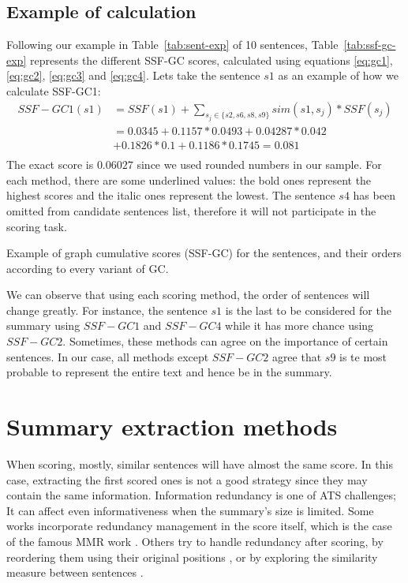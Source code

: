 \subsection{Example of calculation}

Following our example in Table~\ref{tab:sent-exp} of 10 sentences, Table~\ref{tab:ssf-gc-exp} represents the different SSF-GC scores, calculated using equations \ref{eq:gc1}, \ref{eq:gc2}, \ref{eq:gc3} and \ref{eq:gc4}.
Lets take the sentence $ s1 $ as an example of how we calculate SSF-GC1:
\begin{align*}
	SSF-GC1(s1) & = SSF(s1) + \sum\limits_{s_j \in \{s2, s6, s8, s9\}} sim(s1, s_j) * SSF(s_j) \\
	& = 0.0345 + 0.1157 * 0.0493 + 0.04287 * 0.042 \\
	& + 0.1826 * 0.1 + 0.1186 * 0.1745 = 0.081 \\
\end{align*}
The exact score is $ 0.06027 $ since we used rounded numbers in our sample.
For each method, there are some underlined values: the bold ones represent the highest scores and the italic ones represent the lowest.
The sentence $ s4 $ has been omitted from candidate sentences list, therefore it will not participate in the scoring task.

\begin{table}[ht]
	\centering
	\caption{Example of graph cumulative scores (SSF-GC) for the sentences, and their orders according to every variant of GC.}
	\label{tab:ssf-gc-exp}
\end{table}

We can observe that using each scoring method, the order of sentences will change greatly. 
For instance, the sentence $ s1 $ is the last to be considered for the summary using $ SSF-GC1 $ and $ SSF-GC4 $ while it has more chance using $ SSF-GC2 $. 
Sometimes, these methods can agree on the importance of certain sentences. 
In our case, all methods except $ SSF-GC2 $ agree that $ s9 $ is te most probable to represent the entire text and hence be in the summary.


\section{Summary extraction methods}

When scoring, mostly, similar sentences will have almost the same score. 
In this case, extracting the first scored ones is not a good strategy since they may contain the same information. 
Information redundancy is one of ATS challenges; It can affect even informativeness when the summary's size is limited.
Some works incorporate redundancy management in the score itself, which is the case of the famous MMR work \citep{98-carbonell-goldstein}. 
Others try to handle redundancy after scoring, by reordering them using their original positions \citep{99-mckeown-al,00-radev-al,02-lin-hovy}, or by exploring the similarity measure between sentences \citep{15-aries-al}.

